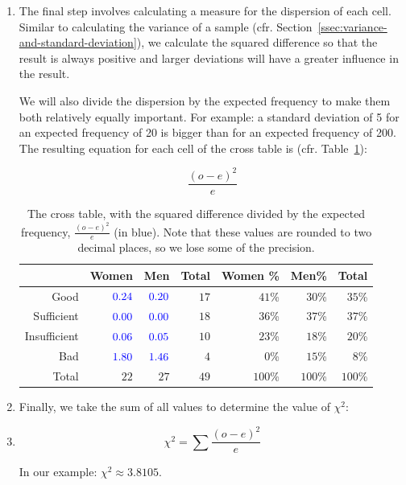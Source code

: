 \begin{enumerate}
  \item The final step involves calculating a measure for the dispersion of each cell. Similar to calculating the variance of a sample (cfr. Section~\ref{ssec:variance-and-standard-deviation}), we calculate the squared difference so that the result is always positive and larger deviations will have a greater influence in the result.

  We will also divide the dispersion by the expected frequency to make them both relatively equally important. For example: a standard deviation of 5 for an expected frequency of 20 is bigger than for an expected frequency of 200. The resulting equation for each cell of the cross table is (cfr. Table~\ref{tab:crosstable3}):

  \begin{equation}
    \frac{(o - e)^{2}}{e}
  \end{equation}

  \begin{table} \centering
    \begin{tabular}{@{}rrrrrrr@{}}
      \toprule
                &                    Women &                      Men &  Total & Women \% &   Men\% &   Total \\
    	\midrule
           Good & $\textcolor{blue}{0.24}$ & $\textcolor{blue}{0.20}$ &   $17$ &   $41$\% &  $30$\% &  $35$\% \\
     Sufficient & $\textcolor{blue}{0.00}$ & $\textcolor{blue}{0.00}$ &   $18$ &   $36$\% &  $37$\% &  $37$\% \\
   Insufficient & $\textcolor{blue}{0.06}$ & $\textcolor{blue}{0.05}$ &   $10$ &   $23$\% &  $18$\% &  $20$\% \\
            Bad & $\textcolor{blue}{1.80}$ & $\textcolor{blue}{1.46}$ &    $4$ &    $0$\% &  $15$\% &   $8$\% \\
          Total &                     $22$ &                     $27$ &   $49$ &  $100$\% & $100$\% & $100$\% \\
    	\bottomrule
    \end{tabular}
    \caption{The cross table, with the squared difference divided by the expected frequency, $\frac{(o - e)^2}{e}$ (in blue). Note that these values are rounded to two decimal places, so we lose some of the precision.}
    \label{tab:crosstable3}
  \end{table}

  \item Finally, we take the sum of all values to determine the value of $\chi^{2}$:
  \item 
  \begin{equation}
    \chi^{2} = \sum \frac{(o - e)^{2}}{e}
    \end{equation}
    
    In our example: $\chi^2 \approx 3.8105$.
\end{enumerate}

